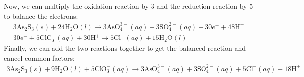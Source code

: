 \documentclass[12pt]{article}
\begin{document}
 Now, we can multiply the oxidation reaction by 3 and the reduction reaction by 5 to balance the electrons:
\begin{equation}
\begin{array}{l}
3 \mathrm{As}_{2} \mathrm{S}_{3}(s) + 24 \mathrm{H}_{2} \mathrm{O}(l) \rightarrow 3 \mathrm{AsO}_{4}^{3-}(a q) + 3 \mathrm{SO}_{4}^{2-}(a q) + 30 e^{-} + 48 \mathrm{H}^{+}\\
30 e^{-} + 5 \mathrm{ClO}_{3}^{-}(a q) + 30 \mathrm{H}^{+} \rightarrow 5 \mathrm{Cl}^{-}(a q) + 15 \mathrm{H}_{2} \mathrm{O}(l)
\end{array}
\end{equation}
Finally, we can add the two reactions together to get the balanced reaction and cancel common factors:
\begin{equation}
\begin{array}{l}
3 \mathrm{As}_{2} \mathrm{S}_{3}(s) + 9 \mathrm{H}_{2} \mathrm{O}(l) + 5 \mathrm{ClO}_{3}^{-}(a q) \rightarrow 3 \mathrm{AsO}_{4}^{3-}(a q) + 3 \mathrm{SO}_{4}^{2-}(a q) + 5 \mathrm{Cl}^{-}(a q) + 18 \mathrm{H}^{+}
\end{array}
\end{equation}
\end{document}
